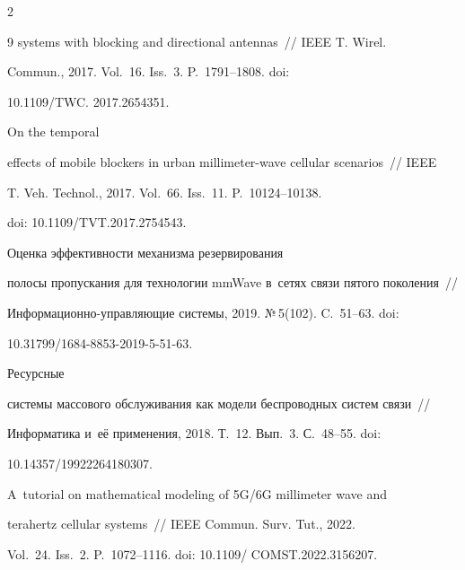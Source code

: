\begin{multicols}{2}
{{\begin{thebibliography}{9}
systems with blocking and directional antennas~// IEEE T. Wirel. 

Commun., 2017. Vol.~16. Iss.~3. P.~1791--1808. doi: 

10.1109/TWC. 2017.2654351.




 On the temporal 

effects of mobile blockers in urban millimeter-wave cellular scenarios~// IEEE 

T. Veh. Technol., 2017. Vol.~66. Iss.~11. P.~10124--10138. 

doi: 10.1109/TVT.2017.2754543.




 Оценка эф\-фек\-тив\-ности механизма резервирования 

полосы про\-пус\-ка\-ния для технологии mmWave в~сетях связи пятого поколения~// 

Ин\-фор\-ма\-ци\-он\-но-управ\-ля\-ющие сис\-те\-мы, 2019. №\,5(102). C.~51--63. doi: 

10.31799/1684-8853-2019-5-51-63.



\pagebreak





Ресурсные

сис\-те\-мы массового обслуживания как модели беспроводных сис\-тем связи~// 

Информатика и~её применения, 2018. Т.~12. Вып.~3. С.~48--55. doi: 

10.14357/19922264180307.




 A~tutorial on mathematical modeling of 5G/6G millimeter wave and 

terahertz cellular systems~// IEEE Commun. Surv. Tut., 2022. 

Vol.~24. Iss.~2. P.~1072--1116. doi: 10.1109/ COMST.2022.3156207.





\end{thebibliography}



 }

 }



\end{multicols}
